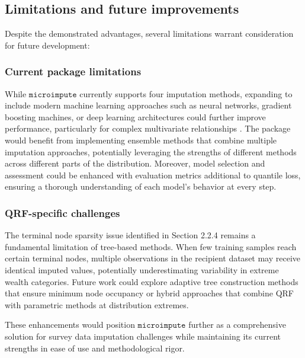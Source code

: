 \subsection{Limitations and future improvements}

Despite the demonstrated advantages, several limitations warrant consideration for future development:

\subsubsection{Current package limitations}

While $\texttt{microimpute}$ currently supports four imputation methods, expanding to include modern machine learning approaches such as neural networks, gradient boosting machines, or deep learning architectures could further improve performance, particularly for complex multivariate relationships \citep{alaa2024deep}. The package would benefit from implementing ensemble methods that combine multiple imputation approaches, potentially leveraging the strengths of different methods across different parts of the distribution. Moreover, model selection and assessment could be enhanced with evaluation metrics additional to quantile loss, ensuring a thorough understanding of each model's behavior at every step.

\subsubsection{QRF-specific challenges}

The terminal node sparsity issue identified in Section 2.2.4 remains a fundamental limitation of tree-based methods. When few training samples reach certain terminal nodes, multiple observations in the recipient dataset may receive identical imputed values, potentially underestimating variability in extreme wealth categories. Future work could explore adaptive tree construction methods that ensure minimum node occupancy or hybrid approaches that combine QRF with parametric methods at distribution extremes.

These enhancements would position $\texttt{microimpute}$ further as a comprehensive solution for survey data imputation challenges while maintaining its current strengths in ease of use and methodological rigor.